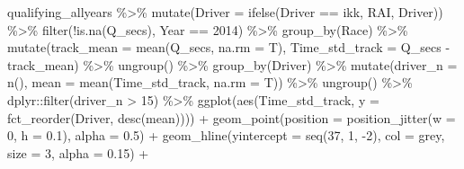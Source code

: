 \documentclass[
]{book}
\newenvironment{Shaded}{\begin{snugshade}}{\end{snugshade}}
\newcommand{\AttributeTok}[1]{\textcolor[rgb]{0.77,0.63,0.00}{#1}}
\newcommand{\DecValTok}[1]{\textcolor[rgb]{0.00,0.00,0.81}{#1}}
\newcommand{\FloatTok}[1]{\textcolor[rgb]{0.00,0.00,0.81}{#1}}
\newcommand{\FunctionTok}[1]{\textcolor[rgb]{0.00,0.00,0.00}{#1}}
\newcommand{\NormalTok}[1]{#1}
\newcommand{\SpecialCharTok}[1]{\textcolor[rgb]{0.00,0.00,0.00}{#1}}
\newcommand{\StringTok}[1]{\textcolor[rgb]{0.31,0.60,0.02}{#1}}
\begin{document}
\begin{Shaded}
\begin{Highlighting}[]
\NormalTok{qualifying\_allyears }\SpecialCharTok{\%\textgreater{}\%}
  \FunctionTok{mutate}\NormalTok{(}\AttributeTok{Driver =} \FunctionTok{ifelse}\NormalTok{(Driver }\SpecialCharTok{==} \StringTok{\textquotesingle{}ikk\textquotesingle{}}\NormalTok{, }\StringTok{\textquotesingle{}RAI\textquotesingle{}}\NormalTok{, Driver)) }\SpecialCharTok{\%\textgreater{}\%} 
  \FunctionTok{filter}\NormalTok{(}\SpecialCharTok{!}\FunctionTok{is.na}\NormalTok{(Q\_secs),}
\NormalTok{         Year }\SpecialCharTok{==} \DecValTok{2014}\NormalTok{) }\SpecialCharTok{\%\textgreater{}\%}
  \FunctionTok{group\_by}\NormalTok{(Race) }\SpecialCharTok{\%\textgreater{}\%}
  \FunctionTok{mutate}\NormalTok{(}\AttributeTok{track\_mean =} \FunctionTok{mean}\NormalTok{(Q\_secs, }\AttributeTok{na.rm =}\NormalTok{ T),}
         \AttributeTok{Time\_std\_track =}\NormalTok{ Q\_secs }\SpecialCharTok{{-}}\NormalTok{ track\_mean) }\SpecialCharTok{\%\textgreater{}\%} 
  \FunctionTok{ungroup}\NormalTok{() }\SpecialCharTok{\%\textgreater{}\%} 
  \FunctionTok{group\_by}\NormalTok{(Driver) }\SpecialCharTok{\%\textgreater{}\%} 
  \FunctionTok{mutate}\NormalTok{(}\AttributeTok{driver\_n =} \FunctionTok{n}\NormalTok{(),}
         \AttributeTok{mean =} \FunctionTok{mean}\NormalTok{(Time\_std\_track, }\AttributeTok{na.rm =}\NormalTok{ T)) }\SpecialCharTok{\%\textgreater{}\%}
  \FunctionTok{ungroup}\NormalTok{() }\SpecialCharTok{\%\textgreater{}\%}
\NormalTok{  dplyr}\SpecialCharTok{::}\FunctionTok{filter}\NormalTok{(driver\_n }\SpecialCharTok{\textgreater{}} \DecValTok{15}\NormalTok{) }\SpecialCharTok{\%\textgreater{}\%} 
  \FunctionTok{ggplot}\NormalTok{(}\FunctionTok{aes}\NormalTok{(Time\_std\_track, }\AttributeTok{y =} \FunctionTok{fct\_reorder}\NormalTok{(Driver, }\FunctionTok{desc}\NormalTok{(mean)))) }\SpecialCharTok{+}
  \FunctionTok{geom\_point}\NormalTok{(}\AttributeTok{position =} \FunctionTok{position\_jitter}\NormalTok{(}\AttributeTok{w =} \DecValTok{0}\NormalTok{, }\AttributeTok{h =} \FloatTok{0.1}\NormalTok{), }\AttributeTok{alpha =} \FloatTok{0.5}\NormalTok{) }\SpecialCharTok{+}
  \FunctionTok{geom\_hline}\NormalTok{(}\AttributeTok{yintercept =} \FunctionTok{seq}\NormalTok{(}\DecValTok{37}\NormalTok{, }\DecValTok{1}\NormalTok{, }\SpecialCharTok{{-}}\DecValTok{2}\NormalTok{), }\AttributeTok{col =} \StringTok{\textquotesingle{}grey\textquotesingle{}}\NormalTok{, }\AttributeTok{size =} \DecValTok{3}\NormalTok{, }\AttributeTok{alpha =} \FloatTok{0.15}\NormalTok{) }\SpecialCharTok{+}

\end{Highlighting}
\end{Shaded}
\end{document}
